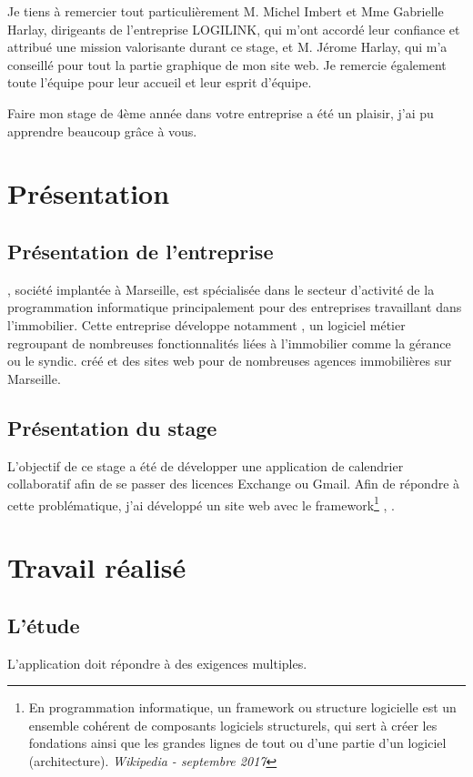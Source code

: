 \documentclass[a4paper, 11pt]{report}
\begin{document}
Je tiens à remercier tout particulièrement M. Michel Imbert et Mme Gabrielle Harlay, dirigeants de l'entreprise LOGILINK,  qui m'ont accordé leur confiance et attribué une mission valorisante durant ce stage, et M. Jérome Harlay, qui m'a conseillé pour tout la partie graphique de mon site web. Je remercie également toute l'équipe pour leur accueil et leur esprit d'équipe.

Faire mon stage de 4ème année dans votre entreprise a été un plaisir, j'ai pu apprendre beaucoup grâce à vous.

\tableofcontents

\chapter{Présentation}
\section{Présentation de l'entreprise}
\logilink, société implantée à Marseille, est spécialisée dans le secteur d'activité de la programmation informatique principalement pour des entreprises travaillant dans l'immobilier. Cette entreprise développe notamment \ulti, un logiciel métier regroupant de nombreuses fonctionnalités liées à l’immobilier comme la gérance ou le syndic. \logilink créé et des sites web pour de nombreuses agences immobilières sur Marseille.

\section{Présentation du stage}
L'objectif de ce stage a été de développer une application de calendrier collaboratif afin de se passer des licences Exchange ou Gmail. Afin de répondre à cette problématique, j'ai développé un site web avec le framework\footnote{En programmation informatique, un framework ou structure logicielle est un ensemble cohérent de composants logiciels structurels, qui sert à créer les fondations ainsi que les grandes lignes de tout ou d'une partie d'un logiciel (architecture). \textit{Wikipedia - septembre 2017}} \php, \symfony.

\chapter{Travail réalisé}
\section{L'étude}
L'application doit répondre à des exigences multiples.
\end{document}
